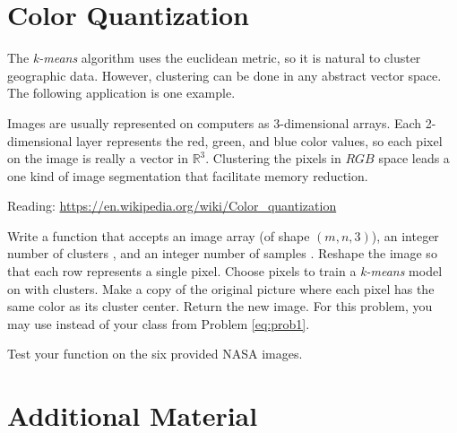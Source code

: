 \section*{Color Quantization} %

The \emph{k-means} algorithm uses the euclidean metric, so it is natural to cluster geographic data.
However, clustering can be done in any abstract vector space.
The following application is one example.

Images are usually represented on computers as 3-dimensional arrays.
Each 2-dimensional layer represents the red, green, and blue color values, so each pixel on the image is really a vector in $\mathbb{R}^3$.
Clustering the pixels in $RGB$ space leads a one kind of image segmentation that facilitate memory reduction.

Reading: \url{https://en.wikipedia.org/wiki/Color_quantization}

\begin{problem}
Write a function that accepts an image array (of shape $(m,n,3)$), an integer number of clusters , and an integer number of samples .
Reshape the image so that each row represents a single pixel.
Choose  pixels to train a \emph{k-means} model on with  clusters.
Make a copy of the original picture where each pixel has the same color as its cluster center.
Return the new image.
For this problem, you may use  instead of your  class from Problem \ref{eq:prob1}.

Test your function on the six provided NASA images.
\end{problem}

\newpage

\section*{Additional Material} %

